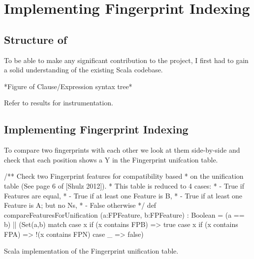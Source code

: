 
\chapter{Implementing Fingerprint Indexing}
\label{cha:method}

\section{Structure of \beagle}
\label{sec:initial}

To be able to make any significant contribution to the \beagle project, I first
had to gain a solid understanding of the existing Scala codebase.

*Figure of Clause/Expression syntax tree*

Refer to results for instrumentation.

\section{Implementing Fingerprint Indexing}
\label{sec:initial}

To compare two fingerprints with each other we look at them side-by-side and check
that each position shows a Y in the Fingerprint unifcation table. 
\begin{listing}[H]
\begin{scalacode}
 /** Check two Fingerprint features for compatibility based
   * on the unification table (See page 6 of [Shulz 2012]).
   * This table is reduced to 4 cases:
   *  - True if Features are equal,
   *  - True if at least one Feature is B,
   *  - True if at least one Feature is A; but no Ns,
   *  - False otherwise  */
  def compareFeaturesForUnification
         (a:FPFeature, b:FPFeature) : Boolean =
  (a == b) || 
  (Set(a,b) match {
    case x if (x contains FPB) => true
    case x if (x contains FPA) => !(x contains FPN)
    case _ => false})
\end{scalacode}
\caption{Scala implementation of the Fingerprint unification table. \protect\cite[p6]{shulz12}}
\label{lst:unitable}
\end{listing}

